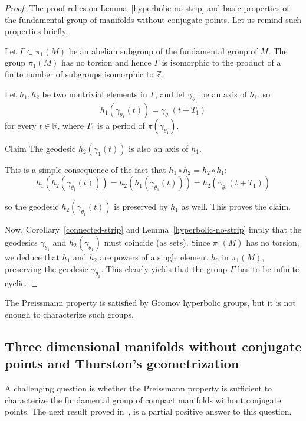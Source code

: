 \documentclass[10pt]{amsart}
\theoremstyle{definition}
\newcommand{\bbR}{\mathbb{R}}
\newcommand{\bbZ}{\mathbb{Z}}
\begin{document}
\begin{proof}
The proof relies on Lemma~\ref{hyperbolic-no-strip} and basic properties of the fundamental group of manifolds without conjugate points. Let us remind such properties briefly.

Let $\Gamma \subset \pi_{1}(M)$ be an abelian subgroup of the fundamental group of $M$. The group $\pi_{1}(M)$ has no torsion and hence $\Gamma$ is isomorphic to the product of a finite number of subgroups isomorphic to $\bbZ$.

Let $h_{1}, h_{2}$ be two nontrivial elements in $\Gamma$, and let $\gamma_{\theta_{1}}$ be an axis of $h_{1}$, so
\[
h_{1}(\gamma_{\theta_1}(t)) = \gamma_{\theta_1}(t + T_{1})
\]
for every $t \in \bbR$, where $T_{1}$ is a period of $\pi(\gamma_{\theta_{1}})$.

\begin{enonce*}[plain]{Claim}
The geodesic $h_{2}(\gamma_{1}(t))$ is also an axis of $h_{1}$.
\end{enonce*}

This is a simple consequence of the fact that $h_{1}\circ h_{2} = h_{2} \circ h_{1}$:
\[
h_{1}(h_{2}(\gamma_{\theta_{1}}(t))) = h_{2}(h_{1}(\gamma_{\theta_{1}}(t))) = h_{2}(\gamma_{\theta_{1}}(t+ T_{1}))
\]

so the geodesic $h_{2}(\gamma_{\theta_{1}}(t))$ is preserved by $h_{1}$ as well. This proves the claim.

Now, Corollary~\ref{connected-strip} and Lemma~\ref{hyperbolic-no-strip} imply that the geodesics $\gamma_{\theta_{1}}$ and $h_{2}(\gamma_{\theta_{1}}) $ must coincide (as sets). Since $\pi_{1}(M)$ has no torsion, we deduce that $h_{1}$ and $h_{2}$ are powers of a single element $h_{0}$ in $\pi_{1}(M)$, preserving the geodesic $\gamma_{\theta_{1}}$. This clearly yields that the group $\Gamma$ has to be infinite cyclic.
\end{proof}

The Preissmann property is satisfied by Gromov hyperbolic groups, but it is not enough to characterize such groups.

\subsection{Three dimensional manifolds without conjugate points and Thurston's geometrization}

A challenging question is whether the Preissmann property is sufficient to characterize the fundamental group of compact manifolds without conjugate points. The next result proved in~\cite[Chapter~8]{kn:Ruggiero-Ensaios}, is a partial positive answer to this question.
\end{document}
